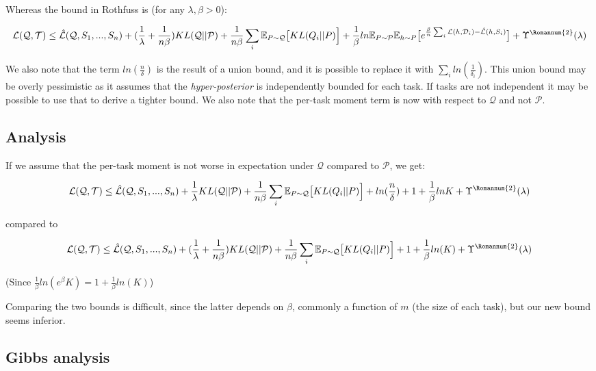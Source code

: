\documentclass[letterpaper]{article}
\theoremstyle{definition}
\begin{document}
Whereas the bound in Rothfuss is (for any $\lambda,\beta>0$):

$$\mathcal{L}(\mathcal{Q}, \mathcal{T}) \leq \hat{\mathcal{L}}(\mathcal{Q}, S_1,...,S_n) + (\frac{1}{\lambda}+\frac{1}{n\beta}) KL(\mathcal{Q}||\mathcal{P}) + \frac{1}{n\beta}\sum_i \mathbb{E}_{P\sim \mathcal{Q}} \bigl [KL(Q_i||P) \Bigr ] + \frac{1}{\beta}ln\mathbb{E}_{P\sim \mathcal{P}}\mathbb{E}_{h\sim P}\bigl [ e^{\frac{\beta}{n}\sum_i\mathcal{L}(h,\mathcal{D}_i)- \hat{\mathcal{L}}(h, S_i)} \bigr ] +\Upsilon^{\text{\Romannum{2}}}(\lambda)$$

We also note that the term $ln(\frac{n}{\delta})$ is the result of a union bound, and it is possible to replace it with $\sum_i ln(\frac{1}{\delta_i})$. This union bound may be overly pessimistic as it assumes that the \emph{hyper-posterior} is independently bounded for each task. If tasks are not independent it may be possible to use that to derive a tighter bound. We also note that the per-task moment term is now with respect to $\mathcal{Q}$ and not $\mathcal{P}$. 

\subsection{Analysis}

If we assume that the per-task moment is not worse in expectation under $\mathcal{Q}$ compared to $\mathcal{P}$, we get: 

$$\mathcal{L}(\mathcal{Q}, \mathcal{T}) \leq \hat{\mathcal{L}}(\mathcal{Q}, S_1,...,S_n) + \frac{1}{\lambda} KL(\mathcal{Q}||\mathcal{P}) + \frac{1}{n\beta}\sum_i \mathbb{E}_{P\sim \mathcal{Q}} \bigl [KL(Q_i||P) \Bigr ] + ln(\frac{n}{\delta})+ 1+\frac{1}{\beta}ln K +\Upsilon^{\text{\Romannum{2}}}(\lambda)$$

compared to 

$$\mathcal{L}(\mathcal{Q}, \mathcal{T}) \leq \hat{\mathcal{L}}(\mathcal{Q}, S_1,...,S_n) + (\frac{1}{\lambda}+\frac{1}{n\beta}) KL(\mathcal{Q}||\mathcal{P}) + \frac{1}{n\beta}\sum_i \mathbb{E}_{P\sim \mathcal{Q}} \bigl [KL(Q_i||P) \Bigr ] + 1+\frac{1}{\beta}ln(K) +\Upsilon^{\text{\Romannum{2}}}(\lambda)$$

(Since $\frac{1}{\beta}ln(e^{\beta}K)=1+\frac{1}{\beta}ln(K)$)

Comparing the two bounds is difficult, since the latter depends on $\beta$, commonly a function of $m$ (the size of each task), but our new bound seems inferior.

\subsection{Gibbs analysis}
\end{document}
